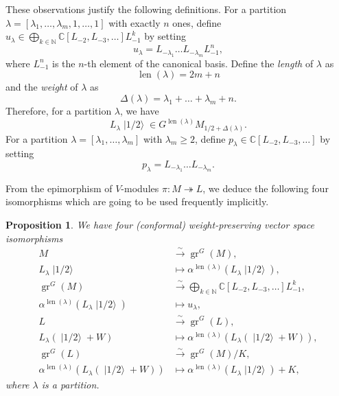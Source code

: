\documentclass[a4paper, 12pt, reqno]{amsart}
\newtheorem{proposition}[theorem]{Proposition}
\theoremstyle{remark}
\DeclareMathOperator{\gr}{gr}
\DeclareMathOperator{\len}{len}
\DeclareMathOperator{\vachalf}{|1/2\rangle}
\begin{document}
These observations justify the following definitions.
For a partition $\lambda = [\lambda_1, \dots, \lambda_m, 1, \dots, 1]$ with exactly $n$ ones, define $u_{\lambda} \in \bigoplus_{k \in \mathbb{N}}\mathbb{C}[L_{-2}, L_{-3}, \dots]L_{-1}^k$ by setting
\begin{equation*}
  u_{\lambda} = L_{-\lambda_1}\dots L_{-\lambda_m}L_{-1}^n,
\end{equation*}
where $L_{-1}^n$ is the $n$-th element of the canonical basis.
Define the \emph{length} of $\lambda$ as
\begin{equation*}
  \len(\lambda) = 2m + n
\end{equation*}
and the \emph{weight} of $\lambda$ as
\begin{equation*}
  \Delta(\lambda) = \lambda_1 + \dots + \lambda_m + n.
\end{equation*}
Therefore, for a partition $\lambda$, we have
\begin{equation*}
  L_{\lambda}\vachalf \in G^{\len(\lambda)}M_{1/2 + \Delta(\lambda)}.
\end{equation*}
For a partition $\lambda = [\lambda_1, \dots, \lambda_m]$ with $\lambda_m \ge 2$, define $p_{\lambda} \in \mathbb{C}[L_{-2}, L_{-3}, \dots]$ by setting
\begin{equation*}
  p_{\lambda} = L_{-\lambda_1}\dots L_{-\lambda_m}.
\end{equation*}

From the epimorphism of $V$-modules $\pi: M \twoheadrightarrow L$, we deduce the following four isomorphisms which are going to be used frequently implicitly.

\begin{proposition}
  \label{prp:3}
  We have four (conformal) weight-preserving vector space isomorphisms
  \begin{align*}
    M &\xrightarrow{\sim} \gr^G(M), \\
    L_{\lambda}\vachalf &\mapsto \alpha^{\len(\lambda)}(L_{\lambda}\vachalf), \\
    \gr^G(M) &\xrightarrow{\sim} \bigoplus_{k \in \mathbb{N}}\mathbb{C}[L_{-2}, L_{-3}, \dots]L_{-1}^k, \\
    \alpha^{\len(\lambda)}(L_{\lambda}\vachalf) &\mapsto u_{\lambda}, \\
    L &\xrightarrow{\sim} \gr^G(L), \\
    L_{\lambda}(\vachalf + W) &\mapsto \alpha^{\len(\lambda)}(L_{\lambda}(\vachalf + W)), \\
    \gr^G(L) &\xrightarrow{\sim} \gr^G(M)/K, \\
    \alpha^{\len(\lambda)}(L_{\lambda}(\vachalf + W)) &\mapsto \alpha^{\len(\lambda)}(L_{\lambda}\vachalf) + K,
  \end{align*}
  where $\lambda$ is a partition.
\end{proposition}
\end{document}
